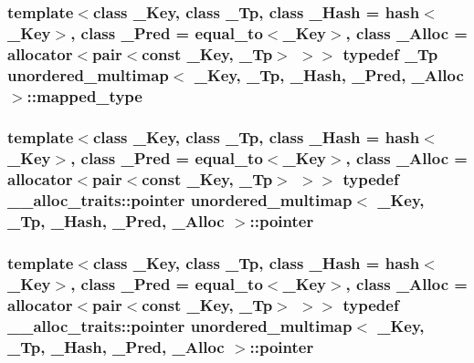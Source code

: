 \subsubsection[{mapped\+\_\+type}]{\setlength{\rightskip}{0pt plus 5cm}template$<$class \+\_\+\+Key, class \+\_\+\+Tp, class \+\_\+\+Hash = hash$<$\+\_\+\+Key$>$, class \+\_\+\+Pred = equal\+\_\+to$<$\+\_\+\+Key$>$, class \+\_\+\+Alloc = allocator$<$pair$<$const \+\_\+\+Key, \+\_\+\+Tp$>$ $>$$>$ typedef \+\_\+\+Tp {\bf unordered\+\_\+multimap}$<$ \+\_\+\+Key, \+\_\+\+Tp, \+\_\+\+Hash, \+\_\+\+Pred, \+\_\+\+Alloc $>$\+::{\bf mapped\+\_\+type}}\label{classunordered__multimap_a50bc9bc504d96ff3c7ca7db1f428eb5e}
\hypertarget{classunordered__multimap_ace9882ddb645e0c73785f46e8c0fc9f4}{}
\subsubsection[{pointer}]{\setlength{\rightskip}{0pt plus 5cm}template$<$class \+\_\+\+Key, class \+\_\+\+Tp, class \+\_\+\+Hash = hash$<$\+\_\+\+Key$>$, class \+\_\+\+Pred = equal\+\_\+to$<$\+\_\+\+Key$>$, class \+\_\+\+Alloc = allocator$<$pair$<$const \+\_\+\+Key, \+\_\+\+Tp$>$ $>$$>$ typedef \+\_\+\+\_\+alloc\+\_\+traits\+::pointer {\bf unordered\+\_\+multimap}$<$ \+\_\+\+Key, \+\_\+\+Tp, \+\_\+\+Hash, \+\_\+\+Pred, \+\_\+\+Alloc $>$\+::{\bf pointer}}\label{classunordered__multimap_ace9882ddb645e0c73785f46e8c0fc9f4}
\hypertarget{classunordered__multimap_ace9882ddb645e0c73785f46e8c0fc9f4}{}
\subsubsection[{pointer}]{\setlength{\rightskip}{0pt plus 5cm}template$<$class \+\_\+\+Key, class \+\_\+\+Tp, class \+\_\+\+Hash = hash$<$\+\_\+\+Key$>$, class \+\_\+\+Pred = equal\+\_\+to$<$\+\_\+\+Key$>$, class \+\_\+\+Alloc = allocator$<$pair$<$const \+\_\+\+Key, \+\_\+\+Tp$>$ $>$$>$ typedef \+\_\+\+\_\+alloc\+\_\+traits\+::pointer {\bf unordered\+\_\+multimap}$<$ \+\_\+\+Key, \+\_\+\+Tp, \+\_\+\+Hash, \+\_\+\+Pred, \+\_\+\+Alloc $>$\+::{\bf pointer}}\label{classunordered__multimap_ace9882ddb645e0c73785f46e8c0fc9f4}
\hypertarget{classunordered__multimap_a0c14a599081fd7cef3adfd73572a78be}{}
